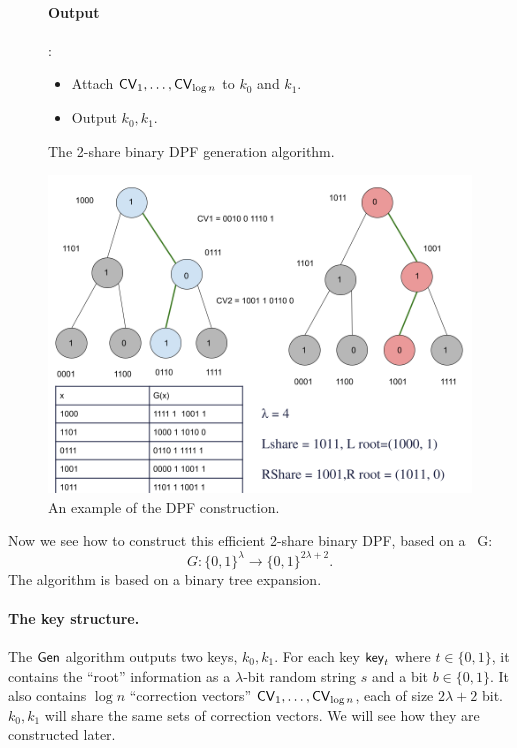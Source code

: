 \begin{figure}
\begin{minipage}{\textwidth}
\begin{mdframed}
            \paragraph{Output}:
            \begin{itemize}
                \item Attach ${\sf CV}_1,\dots,{\sf CV}_{\log n}$ to $k_0$ and $k_1$.
                \item Output $k_0,k_1$.
            \end{itemize}
            
        \end{mdframed}
    \end{minipage}
    \caption{The 2-share binary DPF generation algorithm.\label{fig:DPF}}
\end{figure}

\begin{figure}
    \centering
    \includegraphics[scale=0.4]{scribimg_dpftree.png}
    \caption{An example of the DPF construction.\label{fig:example-DPF}}
\end{figure}


Now we see how to construct this efficient 2-share binary DPF, based on a \Prg \ G:
 $$G: \{0,1\}^{\lambda} \rightarrow  \{0,1\}^{2\lambda + 2}. $$
The algorithm is based on a binary tree expansion.
 
\paragraph{The key structure.} The ${\sf Gen}$ algorithm outputs two keys, $k_0, k_1$. For each key ${\sf key}_t$ where $t\in\{0,1\}$, it contains the ``root'' information as a $\lambda$-bit random string $s$ and a bit $b\in\{0,1\}$. It also contains $\log n$ ``correction vectors'' ${\sf CV}_1, \dots, {\sf CV}_{\log n}$, each of size $2\lambda+2$ bit. $k_0, k_1$ will share the same sets of correction vectors. 
We will see how they are constructed later. 


